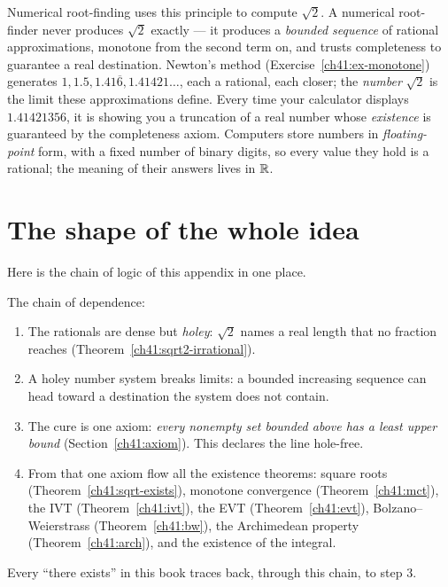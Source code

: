 \begin{applicationbox}
Numerical root-finding uses this principle to compute $\sqrt2$. A numerical
root-finder never produces $\sqrt2$ exactly --- it produces a \emph{bounded sequence} of
rational approximations, monotone from the second term on, and trusts completeness to
guarantee a real destination. Newton's method (Exercise~\ref{ch41:ex-monotone}) generates
$1, 1.5, 1.41\overline{6}, 1.41421\ldots$, each a rational, each closer; the
\emph{number} $\sqrt2$ is the limit these approximations define. Every time your
calculator displays $1.41421356$, it is showing you a truncation of a real number whose
\emph{existence} is guaranteed by the completeness axiom. Computers store numbers in
\emph{floating-point} form, with a fixed number of binary digits, so every value they hold is a
rational; the meaning of their answers lives in $\mathbb{R}$.
\end{applicationbox}

\section{The shape of the whole idea}
\label{ch41:shape}

Here is the chain of logic of this appendix in one place.

\begin{walkbox}
The chain of dependence:
\begin{enumerate}
  \item The rationals are dense but \emph{holey}: $\sqrt 2$ names a real length that no
        fraction reaches (Theorem~\ref{ch41:sqrt2-irrational}).
  \item A holey number system breaks limits: a bounded increasing sequence can head toward
        a destination the system does not contain.
  \item The cure is one axiom: \emph{every nonempty set bounded above has a least upper
        bound} (Section~\ref{ch41:axiom}). This declares the line hole-free.
  \item From that one axiom flow all the existence theorems: square roots
        (Theorem~\ref{ch41:sqrt-exists}), monotone convergence (Theorem~\ref{ch41:mct}),
        the IVT (Theorem~\ref{ch41:ivt}), the EVT (Theorem~\ref{ch41:evt}),
        Bolzano--Weierstrass (Theorem~\ref{ch41:bw}), the Archimedean property
        (Theorem~\ref{ch41:arch}), and the existence of the integral.
\end{enumerate}
Every ``there exists'' in this book traces back, through this chain, to step 3.
\end{walkbox}

